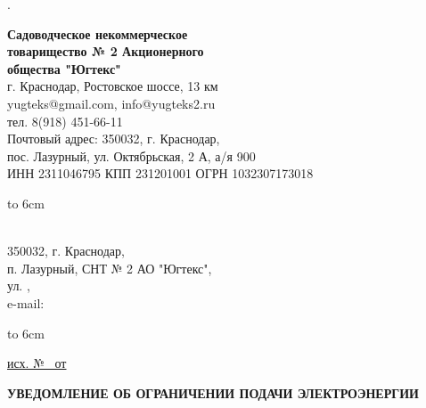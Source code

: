 .
\pagebreak

\noindent\parbox[l][71mm]{80mm}
{
	\begin{center}
		{ \textbf{Садоводческое некоммерческое\\ товарищество
				№  2 Акционерного\\ общества "Югтекс"\\
		}}
		\footnotesize{г. Краснодар, Ростовское шоссе, 13 км\\
			yugteks@gmail.com, info@yugteks2.ru\\
			тел. 8(918) 451-66-11\\
			Почтовый адрес: 350032, г. Краснодар,\\ пос. Лазурный, ул. Октябрьская, 2 А, а/я   900
		}\\
		{ИНН 2311046795 КПП 231201001 ОГРН 1032307173018}
	\end{center}
	\hbox to 6cm{ }}\hfill
\parbox[l][71mm]{65mm}
{ \begin{center}
		{
			\textbf{}\\
			\vspace{5mm}
			{\footnotesize{350032, г. Краснодар,\\ п. Лазурный, СНТ № 2 АО "Югтекс", \\
			ул. , \\
		e-mail: \email } }
			
		}
	\end{center}
	\hbox to 6cm{ }}
\linebreak
\vspace{-12mm}

\underline{исх. №  \, от } 

\vspace{2mm}
\begin{center}
	\textbf{УВЕДОМЛЕНИЕ 
		ОБ ОГРАНИЧЕНИИ ПОДАЧИ ЭЛЕКТРОЭНЕРГИИ}
\end{center}
\par

